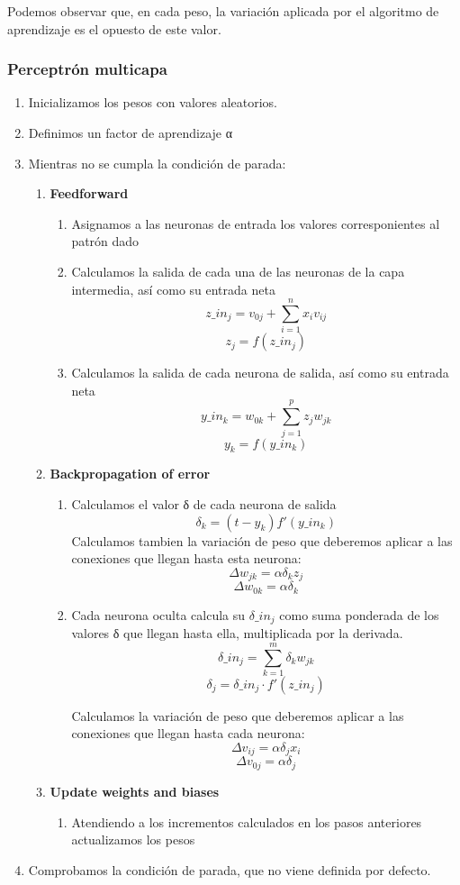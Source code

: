 Podemos observar que, en cada peso, la variación aplicada por el algoritmo de aprendizaje es el opuesto de este valor.


\subsubsection{Perceptrón multicapa}
\begin{enumerate}
\item Inicializamos los pesos con valores aleatorios.
\item Definimos un factor de aprendizaje α
\item Mientras no se cumpla la condición de parada:
\begin{enumerate}
\item \textbf{Feedforward}
\begin{enumerate}
\item Asignamos a las neuronas de entrada los valores corresponientes al patrón dado
\item Calculamos la salida de cada una de las neuronas de la capa intermedia, así como su entrada neta
\[z\_in_j = v_{0j} + \sum_{i=1}^nx_iv_{ij}\]
\[z_j=f(z\_in_j)\]
\item Calculamos la salida de cada neurona de salida, así como su entrada neta
\[y\_in_k = w_{0k} + \sum_{j=1}^pz_jw_{jk}\]
\[y_k = f(y\_in_k)\]
\end{enumerate}
\item \textbf{Backpropagation of error}
\begin{enumerate}
\item Calculamos el valor δ de cada neurona de salida
\[δ_k = (t-y_k)f'(y\_in_k) \]
Calculamos tambien la variación de peso que deberemos aplicar a las conexiones que llegan hasta esta neurona:
\[Δw_{jk}= αδ_kz_j\]
\[Δw_{0k}= αδ_k\]

\item Cada neurona oculta calcula su $δ\_in_j$ como suma ponderada de los valores δ que llegan hasta ella, multiplicada por la derivada.
\[δ\_in_j = \sum_{k=1}^m δ_kw_{jk}\]
\[δ_j= δ\_in_j \cdot f'(z\_in_j)\]

Calculamos la variación de peso que deberemos aplicar a las conexiones que llegan hasta cada neurona:
\[Δv_{ij} = αδ_jx_i\]
\[Δv_{0j} = αδ_j\]

\end{enumerate}
\item \textbf{Update weights and biases}
\begin{enumerate}
\item Atendiendo a los incrementos calculados en los pasos anteriores actualizamos los pesos
\end{enumerate}
\end{enumerate}
\item Comprobamos la condición de parada, que no viene definida por defecto.
\end{enumerate}

